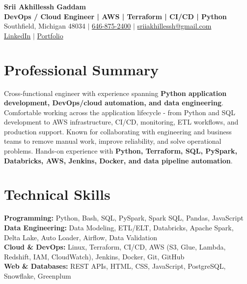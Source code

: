 \documentclass[letterpaper,10pt]{article}
\begin{document}
\fontsize{9.35pt}{10.45pt}\selectfont

\begin{center}
    {\LARGE \textbf{Srii Akhillessh Gaddam}} \\[-1pt]
    \textbf{DevOps / Cloud Engineer | AWS | Terraform | CI/CD | Python} \\[2pt]
    Southfield, Michigan 48034 $|$
    \href{tel:6468752400}{646-875-2400} $|$
    \href{mailto:sriiakhillessh@gmail.com}{sriiakhillessh@gmail.com} \\[1pt]
    \href{https://www.linkedin.com/in/srii-akhiilessh-gaddam-b48668191/}{LinkedIn} $|$
    \href{https://sriiakhillesshg.github.io/portfolio/}{Portfolio}
\end{center}
\vspace{-8pt}

\section{Professional Summary}
\small{Cross-functional engineer with experience spanning \textbf{Python application development, DevOps/cloud automation, and data engineering}. Comfortable working across the application lifecycle - from Python and SQL development to AWS infrastructure, CI/CD, monitoring, ETL workflows, and production support. Known for collaborating with engineering and business teams to remove manual work, improve reliability, and solve operational problems. Hands-on experience with \textbf{Python, Terraform, SQL, PySpark, Databricks, AWS, Jenkins, Docker, and data pipeline automation}.}

\section{Technical Skills}
\small{
\textbf{Programming:} Python, Bash, SQL, PySpark, Spark SQL, Pandas, JavaScript \\
\textbf{Data Engineering:} Data Modeling, ETL/ELT, Databricks, Apache Spark, Delta Lake, Auto Loader, Airflow, Data Validation \\
\textbf{Cloud \& DevOps:} Linux, Terraform, CI/CD, AWS (S3, Glue, Lambda, Redshift, IAM, CloudWatch), Jenkins, Docker, Git, GitHub \\
\textbf{Web \& Databases:} REST APIs, HTML, CSS, JavaScript, PostgreSQL, Snowflake, Greenplum
}
\end{document}
